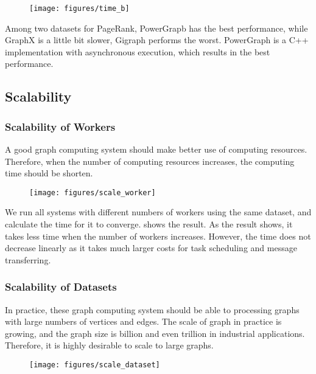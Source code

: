 \begin{figure}[t]
  \texttt{[image: figures/time\_b]}
  \caption{}
  \label{fig:time:b}
\end{figure}

Among two datasets for PageRank, PowerGrapb has the best performance,
while GraphX is a little bit slower, Gigraph performs the worst.
PowerGraph is a C++ implementation with asynchronous execution, which
results in the best performance.

\subsection{Scalability} \label{subsec:scalability}
\subsubsection{Scalability of Workers}
A good graph computing system should make better use of computing
resources. Therefore, when the number of computing resources increases,
the computing time should be shorten.

\begin{figure}[t]
  \texttt{[image: figures/scale\_worker]}
  \caption{}
  \label{fig:scale:worker}
\end{figure}

We run all systems with different numbers of workers using the same dataset,
and calculate the time for it to converge. 
shows the result. As the result shows, it takes less time
when the number of workers increases. However, the time
does not decrease linearly as it takes much larger costs
for task scheduling and message transferring.

\subsubsection{Scalability of Datasets}
In practice, these graph computing system should be able to processing
graphs with large numbers of vertices and edges. The scale of graph
in practice is growing, and the graph size is billion and even trillion
in industrial applications. Therefore, it is highly desirable to
scale to large graphs.

\begin{figure}[t]
  \texttt{[image: figures/scale\_dataset]}
  \caption{}
  \label{}
\end{figure}

